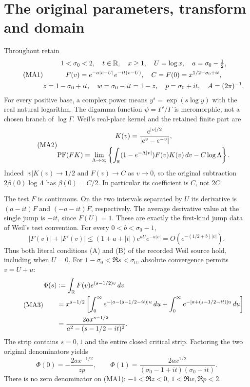 \documentclass[11pt,a4paper]{article}
\providecommand{\dd}{\,d}
\begin{document}
\section{The original parameters, transform and domain}
Throughout retain
\begin{equation}\tag{MA1}\begin{gathered}
 1<\sigma_0<2,\quad t\in\mathbb R,\quad x\ge1,\quad U=\log x,\quad
 a=\sigma_0-\tfrac12,\\
 F(v)=e^{-a|v-U|}e^{-it(v-U)},\quad
 C=F(0)=x^{1/2-\sigma_0+it},\\
 z=1-\sigma_0+it,\quad w=\sigma_0-it=1-z,\quad
 p=\sigma_0+it,\quad A=(2\pi)^{-1}.
\end{gathered}\end{equation}
For every positive base, a complex power means $y^s=\exp(s\log y)$ with
the real natural logarithm. The digamma function $\psi=\Gamma'/\Gamma$
is meromorphic, not a chosen branch of $\log\Gamma$.
Weil's real-place kernel and the retained finite part \cite{a03ma:Weil} are
\begin{equation}\tag{MA2}\begin{gathered}
 K(v)=\frac{e^{|v|/2}}{|e^v-e^{-v}|},\\
 \PF(FK)=\lim_{\Lambda\to\infty}
 \left\{\int_\R(1-e^{-\Lambda|v|})F(v)K(v)\dd v-C\log\Lambda\right\}.
\end{gathered}\end{equation}
Indeed $|v|K(v)\to1/2$ and $F(v)\to C$ as $v\to0$, so the original
subtraction $2\beta(0)\log\Lambda$ has $\beta(0)=C/2$. In particular its
coefficient is $C$, not $2C$.

The test $F$ is continuous. On the two intervals separated by $U$ its
derivative is $(a-it)F$ and $(-a-it)F$, respectively. The average derivative
value at the single jump is $-it$, since $F(U)=1$. These are exactly the
first-kind jump data of Weil's test convention. For every
$0<b<\sigma_0-1$,
\[
 |F(v)|+|F'(v)|\le(1+a+|t|)e^{aU}e^{-a|v|}
 =O(e^{-(1/2+b)|v|}).
\]
Thus both literal conditions (A) and (B) of the recorded Weil source hold,
including when $U=0$.
For $1-\sigma_0<\Re s<\sigma_0$, absolute convergence permits $v=U+u$:
\begin{equation}\tag{MA3}\begin{aligned}
 \Phi(s)&:=\int_\R F(v)e^{(s-1/2)v}\dd v\\
 &=x^{s-1/2}\left[
 \int_0^\infty e^{-[a-(s-1/2-it)]u}\dd u
 +\int_0^\infty e^{-[a+(s-1/2-it)]u}\dd u\right]\\
 &=\frac{2a x^{s-1/2}}{a^2-(s-1/2-it)^2}.
\end{aligned}\end{equation}
The strip contains $s=0,1$ and the entire closed critical strip. Factoring
the two original denominators yields
\begin{equation}\tag{MA4}
 \Phi(0)=-\frac{2a x^{-1/2}}{zp},\qquad
 \Phi(1)=\frac{2a x^{1/2}}{(\sigma_0-1+it)(\sigma_0-it)}.
\end{equation}
There is no zero denominator on (MA1): $-1<\Re z<0$, $1<\Re w,\Re p<2$.
\end{document}
